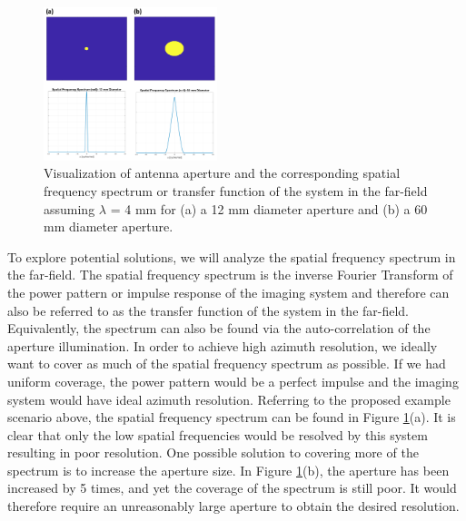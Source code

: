 \documentclass{article}
\begin{document}
\begin{figure}[h!]
    \centering
    \includegraphics[width=0.45\textwidth]{Figures/VaryDiameter.png}
\caption{Visualization of antenna aperture and the corresponding spatial frequency spectrum or transfer function of the system in the far-field assuming $\lambda$ = 4 mm for (a) a 12 mm diameter aperture and (b) a 60 mm diameter aperture.}
\label{AzResDSize}
\end{figure}
\newline
\indent
To explore potential solutions, we will analyze the spatial frequency spectrum in the far-field. The spatial frequency spectrum is the inverse Fourier Transform of the power pattern or impulse response of the imaging system and therefore can also be referred to as the transfer function of the system in the far-field. Equivalently, the spectrum can also be found via the auto-correlation of the aperture illumination. In order to achieve high azimuth resolution, we ideally want to cover as much of the spatial frequency spectrum as possible. If we had uniform coverage, the power pattern would be a perfect impulse and the imaging system would have ideal azimuth resolution. Referring to the proposed example scenario above, the spatial frequency spectrum can be found in Figure \ref{AzResDSize}(a). It is clear that only the low spatial frequencies would be resolved by this system resulting in poor resolution. One possible solution to covering more of the spectrum is to increase the aperture size. In Figure \ref{AzResDSize}(b), the aperture has been increased by 5 times, and yet the coverage of the spectrum is still poor. It would therefore require an unreasonably large aperture to obtain the desired resolution.
\end{document}
